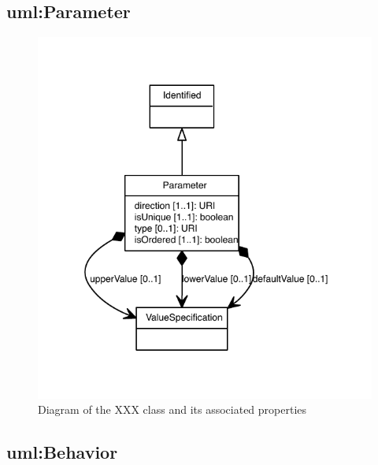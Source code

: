 \subsection{uml:Parameter}
\label{sec:uml:Parameter}

\begin{figure}[ht]
\begin{center}
\includegraphics[scale=0.6]{uml_classes/Parameter_abstraction_hierarchy.pdf}
\caption[]{Diagram of the XXX class and its associated properties}
\label{uml:Parameter}
\end{center}
\end{figure}


\subsection{uml:Behavior}
\label{sec:uml:Behavior}

